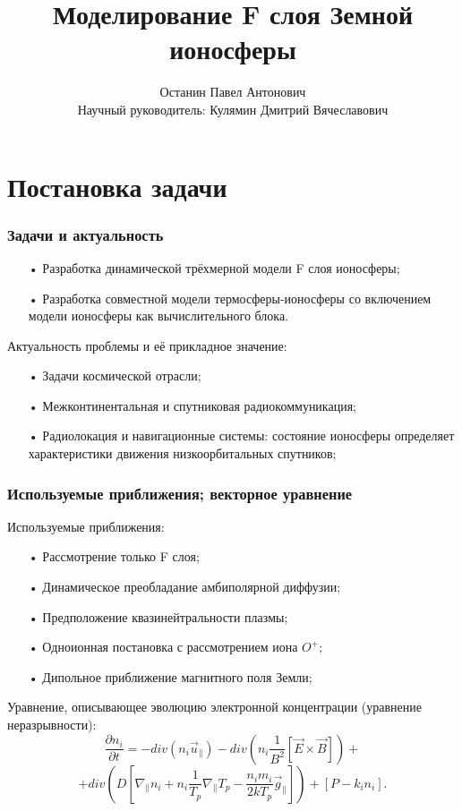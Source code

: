 \documentclass[9pt, apectratio=43,unicode]{beamer}
\title[Моделирование F слоя Земной ионосферы]{Моделирование F слоя Земной ионосферы}
\author[Останин П. А.]{Останин Павел Антонович  \\ \vspace{1ex} Научный руководитель: Кулямин Дмитрий Вячеславович}
\date{ }
\begin{document}
\begin{frame}[plain]
\titlepage
\end{frame}

\def\L{\mathcal{L}}

\section{Постановка задачи}
\begin{frame}\frametitle{Задачи и актуальность}
\begin{itemize}
\item[•] Разработка динамической трёхмерной модели F слоя ионосферы;
\item[•] Разработка совместной модели термосферы-ионосферы со включением модели ионосферы как вычислительного блока.
\end{itemize}

Актуальность проблемы и её прикладное значение:
\begin{itemize}
\item[•] Задачи космической отрасли;
\item[•] Межконтинентальная и спутниковая радиокоммуникация;
\item[•] Радиолокация и навигационные системы: состояние ионосферы определяет характеристики движения низкоорбитальных спутников;
\end{itemize}


\end{frame}

\begin{frame}\frametitle{Используемые приближения; векторное уравнение}

Используемые приближения:
\begin{itemize}
\item[•] Рассмотрение только F слоя; 
\item[•] Динамическое преобладание амбиполярной диффузии;
\item[•] Предположение квазинейтральности плазмы;
\item[•] Одноионная постановка с рассмотрением иона $O^+$;
\item[•] Дипольное приближение магнитного поля Земли;
\end{itemize}

Уравнение, описывающее эволюцию электронной концентрации (уравнение неразрывности): $$\dfrac{\partial n_i}{\partial t} = -div(n_i \vec{u}_\parallel)-div\left(n_i\dfrac{1}{B^2}[\vec{E}\times \vec{B}] \right)+$$ $$+div\left(D\left[\nabla_\parallel n_i +n_i\dfrac{1}{T_p}\nabla_\parallel T_p - \dfrac{n_i m_i}{2kT_p}\vec{g}_\parallel\right]\right)+[P-k_in_i].$$

\end{frame}
\end{document}
